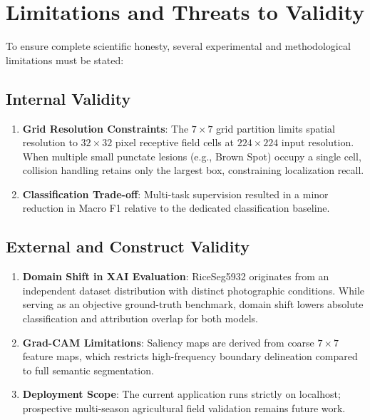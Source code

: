 \section{Limitations and Threats to Validity}
\label{sec:limitations}

To ensure complete scientific honesty, several experimental and methodological limitations must be stated:

\subsection{Internal Validity}
\begin{enumerate}
    \item \textbf{Grid Resolution Constraints}: The $7\times 7$ grid partition limits spatial resolution to $32 \times 32$ pixel receptive field cells at $224 \times 224$ input resolution. When multiple small punctate lesions (e.g., Brown Spot) occupy a single cell, collision handling retains only the largest box, constraining localization recall.
    \item \textbf{Classification Trade-off}: Multi-task supervision resulted in a minor reduction in Macro F1 relative to the dedicated classification baseline.
\end{enumerate}

\subsection{External and Construct Validity}
\begin{enumerate}
    \item \textbf{Domain Shift in XAI Evaluation}: RiceSeg5932 originates from an independent dataset distribution with distinct photographic conditions. While serving as an objective ground-truth benchmark, domain shift lowers absolute classification and attribution overlap for both models.
    \item \textbf{Grad-CAM Limitations}: Saliency maps are derived from coarse $7\times 7$ feature maps, which restricts high-frequency boundary delineation compared to full semantic segmentation.
    \item \textbf{Deployment Scope}: The current application runs strictly on localhost; prospective multi-season agricultural field validation remains future work.
\end{enumerate}
